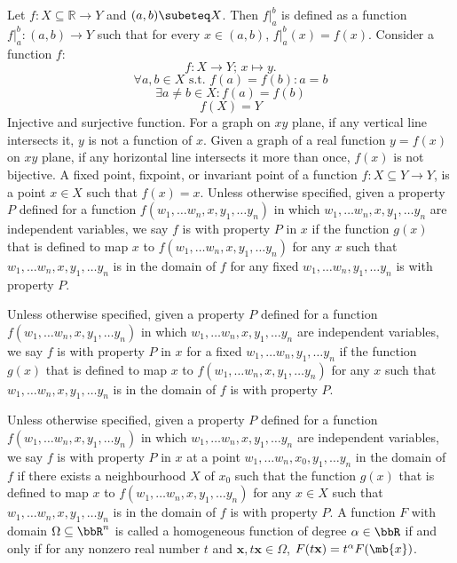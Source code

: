 \documentclass[a4paper,12pt]{article}
\begin{document}
Let $f\colon X\subseteq\mathbb{R}\to Y$ and $(a,b)\subeteq X$. Then $f\vert_a^b$ is defined as a function $f\vert_a^b\colon (a,b)\to Y$ such that for every $x\in (a,b)$, $f\vert_a^b(x)=f(x)$.
Consider a function $f$:
\[f\colon X\to Y;\,x\mapsto y.\]
\[\forall a,b\in X\text{\ s.t.\ } f(a)=f(b)\colon a=b\]
\[\exists a\neq b\in X\colon f(a)=f(b)\]
\[f(X)=Y\]
Injective and surjective function.
For a graph on $xy$ plane, if any vertical line intersects it, $y$ is not a function of $x$.
Given a graph of a real function $y=f(x)$ on $xy$ plane, if any horizontal line intersects it more than once, $f(x)$ is not bijective.
A fixed point, fixpoint, or invariant point of a function $f\colon X\subseteq Y\to Y$, is a point $x\in X$ such that $f(x)=x$.
Unless otherwise specified, given a property $P$ defined for a function $f(w_1,\dots w_n,x,y_1,\dots y_n)$ in which $w_1,\dots w_n,x,y_1,\dots y_n$ are independent variables, we say $f$ is with property $P$ in $x$ if the function $g(x)$ that is defined to map $x$ to $f(w_1,\dots w_n,x,y_1,\dots y_n)$ for any $x$ such that $w_1,\dots w_n,x,y_1,\dots y_n$ is in the domain of $f$ for any fixed $w_1,\dots w_n,y_1,\dots y_n$ is with property $P$.

Unless otherwise specified, given a property $P$ defined for a function $f(w_1,\dots w_n,x,y_1,\dots y_n)$ in which $w_1,\dots w_n,x,y_1,\dots y_n$ are independent variables, we say $f$ is with property $P$ in $x$ for a fixed $w_1,\dots w_n,y_1,\dots y_n$ if the function $g(x)$ that is defined to map $x$ to $f(w_1,\dots w_n,x,y_1,\dots y_n)$ for any $x$ such that $w_1,\dots w_n,x,y_1,\dots y_n$ is in the domain of $f$ is with property $P$.

Unless otherwise specified, given a property $P$ defined for a function $f(w_1,\dots w_n,x,y_1,\dots y_n)$ in which $w_1,\dots w_n,x,y_1,\dots y_n$ are independent variables, we say $f$ is with property $P$ in $x$ at a point $w_1,\dots w_n,x_0,y_1,\dots y_n$ in the domain of $f$ if there exists a neighbourhood $X$ of $x_0$ such that the function $g(x)$ that is defined to map $x$ to $f(w_1,\dots w_n,x,y_1,\dots y_n)$ for any $x\in X$ such that $w_1,\dots w_n,x,y_1,\dots y_n$ is in the domain of $f$ is with property $P$.
A function $F$ with domain $\Omega\subseteq\bbR^n$ is called a homogeneous function of degree $\alpha\in\bbR$ if and only if for any nonzero real number $t$ and $\mathbf{x},t\mathbf{x}\in\Omega$, $F(t\mathbf{x})=t^{\alpha}F(\mb{x})$.
\end{document}
